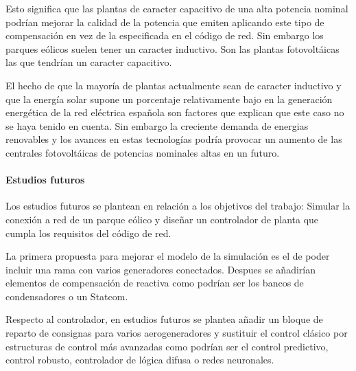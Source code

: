 \documentclass{book}
\begin{document}
\begin{enumerate}[1.]
Esto significa que las plantas de caracter capacitivo de una alta potencia nominal podr\'ian mejorar la calidad de la potencia que emiten aplicando este tipo de compensaci\'on en vez de la especificada en el c\'odigo de red. Sin embargo los parques e\'olicos suelen tener un caracter inductivo. Son las plantas fotovolt\'aicas las que tendr\'ian un caracter capacitivo. \par

El hecho de que la mayor\'ia de plantas actualmente sean de caracter inductivo y que la energ\'ia solar supone un porcentaje relativamente bajo en la generaci\'on energ\'etica de la red el\'ectrica española son factores que explican que este caso no se haya tenido en cuenta. Sin embargo la creciente demanda de energias renovables y los avances en estas tecnolog\'ias podr\'ia provocar un aumento de las centrales fotovolt\'aicas de potencias nominales altas en un futuro. \par

\end{enumerate}

	\paragraph{Estudios futuros}

Los estudios futuros se plantean en relaci\'on a los objetivos del trabajo: Simular la conexi\'on a red de un parque e\'olico y diseñar un controlador de planta que cumpla los requisitos del c\'odigo de red.\par

La primera propuesta para mejorar el modelo de la simulaci\'on es el de poder incluir una rama con varios generadores conectados. Despues se añadir\'ian elementos de compensaci\'on de reactiva como podr\'ian ser los bancos de condensadores o un Statcom. \par

Respecto al controlador, en estudios futuros se plantea añadir un bloque de reparto de consignas para varios aerogeneradores y sustituir el control cl\'asico por estructuras de control m\'as avanzadas como podr\'ian ser el control predictivo, control robusto, controlador de l\'ogica difusa o redes neuronales. \par



\end{document}
